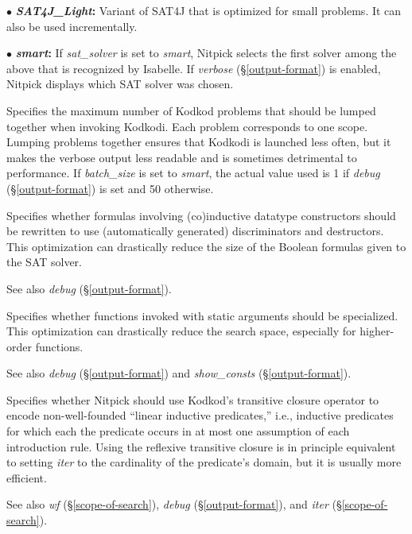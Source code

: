 \documentclass[a4paper,12pt]{article}
\begin{document}
\begin{enum}
\begin{enum}
\item[$\bullet$] \textbf{\textit{SAT4J\_Light}:} Variant of SAT4J that is
optimized for small problems. It can also be used incrementally.

\item[$\bullet$] \textbf{\textit{smart}:} If \textit{sat\_solver} is set to
\textit{smart}, Nitpick selects the first solver among the above that is
recognized by Isabelle. If \textit{verbose} (\S\ref{output-format}) is enabled,
Nitpick displays which SAT solver was chosen.
\end{enum}
\fussy

Specifies the maximum number of Kodkod problems that should be lumped together
when invoking Kodkodi. Each problem corresponds to one scope. Lumping problems
together ensures that Kodkodi is launched less often, but it makes the verbose
output less readable and is sometimes detrimental to performance. If
\textit{batch\_size} is set to \textit{smart}, the actual value used is 1 if
\textit{debug} (\S\ref{output-format}) is set and 50 otherwise.

Specifies whether formulas involving (co)in\-duc\-tive datatype constructors should
be rewritten to use (automatically generated) discriminators and destructors.
This optimization can drastically reduce the size of the Boolean formulas given
to the SAT solver.

\nopagebreak
{\small See also \textit{debug} (\S\ref{output-format}).}

Specifies whether functions invoked with static arguments should be specialized.
This optimization can drastically reduce the search space, especially for
higher-order functions.

\nopagebreak
{\small See also \textit{debug} (\S\ref{output-format}) and
\textit{show\_consts} (\S\ref{output-format}).}

Specifies whether Nitpick should use Kodkod's transitive closure operator to
encode non-well-founded ``linear inductive predicates,'' i.e., inductive
predicates for which each the predicate occurs in at most one assumption of each
introduction rule. Using the reflexive transitive closure is in principle
equivalent to setting \textit{iter} to the cardinality of the predicate's
domain, but it is usually more efficient.

{\small See also \textit{wf} (\S\ref{scope-of-search}), \textit{debug}
(\S\ref{output-format}), and \textit{iter} (\S\ref{scope-of-search}).}


\end{enum}
\end{document}
